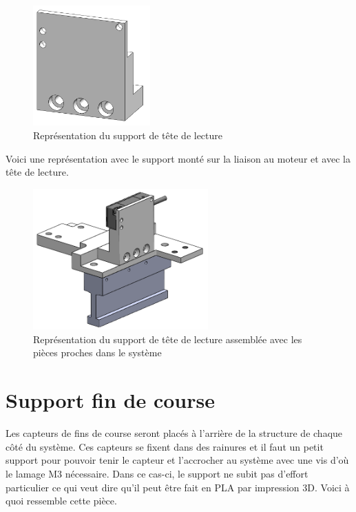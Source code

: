 \begin{figure}[H]
  \centering
  \includegraphics[width = 0.4\textwidth]{assets/figures/SupportTeteLecture.png}
  \caption{Représentation du support de tête de lecture}
  \label{fig:SupTeteLect}
\end{figure}

Voici une représentation avec le support monté sur la liaison au moteur et avec la tête de lecture.

\begin{figure}[H]
  \centering
  \includegraphics[width = 0.6\textwidth]{assets/figures/AssemblageMesureLineaire.png}
  \caption{Représentation du support de tête de lecture assemblée avec les pièces proches dans le système}
  \label{fig:AssMesLin}
\end{figure}

\section{Support fin de course}\label{sec:SupFinCourse}
Les capteurs de fins de course seront placés à l'arrière de la structure de chaque côté du système. Ces capteurs se fixent dans des rainures et
il faut un petit support pour pouvoir tenir le capteur et l'accrocher au système avec une vis d'où le lamage M3 nécessaire. Dans ce cas-ci, le support ne subit pas d'effort particulier
ce qui veut dire qu'il peut être fait en \acrshort{PLA} par impression 3D. Voici à quoi ressemble cette pièce.

